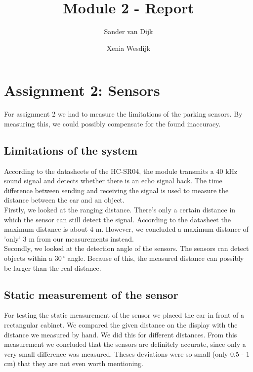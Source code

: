 \documentclass[final]{scrreprt} %
\title{Module 2 - Report}
\author{Sander {van Dijk} \and Xenia {Wesdijk}}
\begin{document}
\chapter{Assignment 2: Sensors}

For assignment 2 we had to measure the limitations of the parking sensors. By measuring this, we could possibly compensate for the found inaccuracy.

\section{Limitations of the system}
According to the datasheets of the HC-SR04, the module transmits a 40 kHz sound signal and detects whether there is an echo signal back. The time difference between sending and receiving the signal is used to measure the distance between the car and an object.\\
Firstly, we looked at the ranging distance. There's only a certain distance in which the sensor can still detect the signal. According to the datasheet the maximum distance is about 4 m. However, we concluded a maximum distance of 'only' 3 m from our measurements instead.\\
Secondly, we looked at the detection angle of the sensors. The sensors can detect objects within a $30\,^{\circ}$ angle. Because of this, the measured distance can possibly be larger than the real distance.\\


\section{Static measurement of the sensor}
For testing the static measurement of the sensor we placed the car in front of a rectangular cabinet. We compared the given distance on the display with the distance we measured by hand. We did this for different distances. From this measurement we concluded that the sensors are definitely accurate, since only a very small difference was measured. Theses deviations were so small (only 0.5 - 1 cm) that they are not even worth mentioning.
\end{document}
